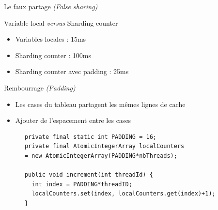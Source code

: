 
\begingroup

\begin{frame}[fragile]{ Le faux partage {\it (False sharing)}}

  \begin{block}{Variable local {\it versus} Sharding counter}
    \begin{itemize}
    \item Variables locales : 15ms
    \item Sharding counter : 100ms
    \item Sharding counter avec padding : 25ms
    \end{itemize}
  \end{block}
  
  \begin{block}{Rembourrage {\it (Padding)}}
    \begin{itemize}
    \item Les cases du tableau partagent les mêmes lignes de cache
    \item Ajouter de l'espacement entre les cases
    \end{itemize}
    \begin{lstlisting}
      private final static int PADDING = 16;
      private final AtomicIntegerArray localCounters
      = new AtomicIntegerArray(PADDING*nbThreads);

      public void increment(int threadId) {
        int index = PADDING*threadID;
        localCounters.set(index, localCounters.get(index)+1);
      }
    \end{lstlisting}
  \end{block}


\end{frame}

\endgroup
\endinput
